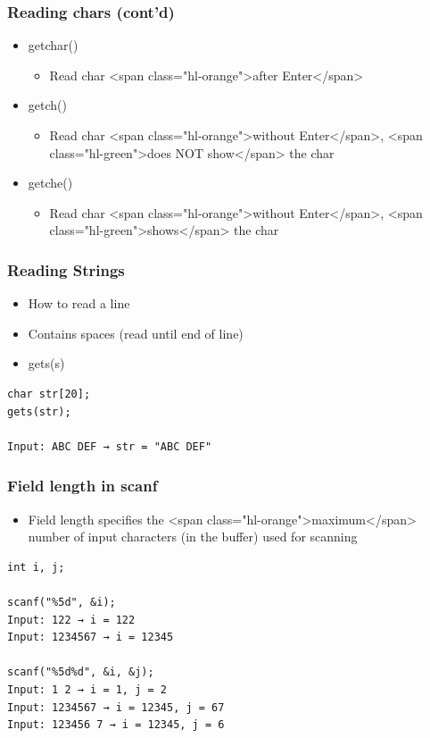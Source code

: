 \documentclass{../c-lecture}
\begin{document}
\begin{frame}
  \frametitle{Reading chars (cont’d)}
  \begin{itemize}
    \item getchar()
    \begin{itemize}
      \item Read char <span class="hl-orange">after Enter</span>
    \end{itemize}
    \item getch()
    \begin{itemize}
      \item
        Read char <span class="hl-orange">without Enter</span>,
        <span class="hl-green">does NOT show</span> the char

    \end{itemize}
    \item getche()
    \begin{itemize}
      \item
        Read char <span class="hl-orange">without Enter</span>,
        <span class="hl-green">shows</span> the char

    \end{itemize}
  \end{itemize}
\end{frame}

\begin{frame}[fragile]
  \frametitle{Reading Strings}
  \begin{itemize}
    \item How to read a line
    \item Contains spaces (read until end of line)
    \item gets(s)
  \end{itemize}
  \begin{verbatim}
char str[20];
gets(str);

Input: ABC DEF → str = "ABC DEF"
  \end{verbatim}
\end{frame}

\begin{frame}[fragile]
  \frametitle{Field length in scanf}
  \begin{itemize}
    \item
      Field length specifies the <span class="hl-orange">maximum</span> number
      of input characters (in the buffer) used for scanning

  \end{itemize}
  \begin{verbatim}
int i, j;

scanf("%5d", &i);
Input: 122 → i = 122
Input: 1234567 → i = 12345

scanf("%5d%d", &i, &j);
Input: 1 2 → i = 1, j = 2
Input: 1234567 → i = 12345, j = 67
Input: 123456 7 → i = 12345, j = 6
  \end{verbatim}
\end{frame}
\end{document}
